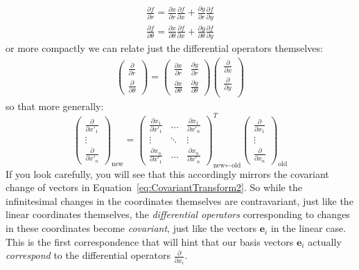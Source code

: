 \documentclass[../master.tex]{subfiles}
\begin{document}
	\begin{align*}
		\frac{\partial f}{\partial r} = \frac{\partial x}{\partial r}\frac{\partial f}{\partial x}  +  \frac{\partial y}{\partial r} \frac{\partial f}{\partial y} \\
		\frac{\partial f}{\partial \theta} = \frac{\partial x}{\partial \theta}\frac{\partial f}{\partial x}  + \frac{\partial y}{\partial \theta}\frac{\partial f}{\partial y}
	\end{align*}
	or more compactly we can relate just the differential operators themselves: 
	\begin{align*}
		\begin{pmatrix}
			\frac{\partial}{\partial r} \\ \frac{\partial}{\partial \theta}
		\end{pmatrix}
		 = 
		 \begin{pmatrix}
		 	\frac{\partial x}{\partial r} & \frac{\partial y}{\partial r} \\
			\frac{\partial x}{\partial \theta} & \frac{\partial y}{\partial \theta}
		 \end{pmatrix}
		 \begin{pmatrix}
		 	\frac{\partial}{\partial x} \\ \frac{\partial}{\partial y} \\
		 \end{pmatrix}
	\end{align*}
	so that more generally: 
	\begin{equation}\label{eq:partial_transform}
		\begin{pmatrix}
			\frac{\partial}{\partial x'_1} \\ \vdots \\ \frac{\partial}{\partial x'_n} 
		\end{pmatrix}_{\text{new}}
		=
	 \begin{pmatrix}
	 	\frac{\partial x_1}{\partial x'_1} & \dots & \frac{\partial x_1}{\partial x'_n} \\
		\vdots & \ddots & \vdots \\
		\frac{\partial x_n}{\partial x'_1} & \dots & \frac{\partial x_n}{\partial x'_n}
	 \end{pmatrix}_{\text{new} \leftarrow \text{old}}^T
	 \begin{pmatrix}
	 	\frac{\partial}{\partial x_1} \\	\vdots \\ \frac{\partial}{\partial x_n}
	 \end{pmatrix}_{\text{old}}
	\end{equation}
	If you look carefully, you will see that this accordingly mirrors the covariant change of vectors in Equation~\eqref{eq:CovariantTransform2}. So while the infinitesimal changes in the coordinates themselves are contravariant, just like the linear coordinates themselves, the \emph{differential operators} corresponding to changes in these coordinates become \emph{covariant}, just like the vectors $\mathbf e_i$ in the linear case. This is the first correspondence that will hint that our basis vectors $\mathbf e_i$ actually \emph{correspond} to the differential operators $\frac{\partial}{\partial x_i}$.
	
\end{document}
